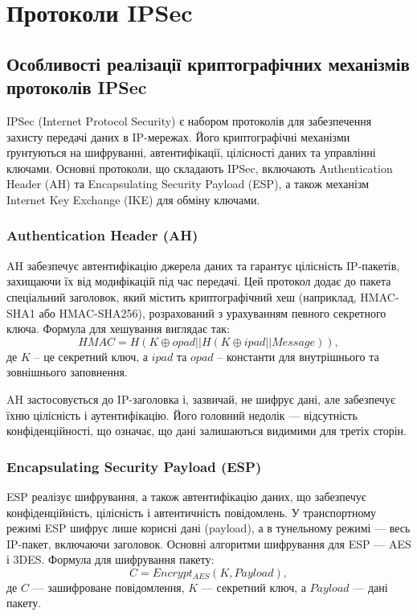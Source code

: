 
\chapter{Протоколи IPSec}
\label{chap:review}  %

\section{Особливості реалізації криптографічних механізмів протоколів IPSec}

IPSec (Internet Protocol Security) є набором протоколів для забезпечення захисту передачі даних в IP-мережах. Його криптографічні механізми ґрунтуються на шифруванні, автентифікації, цілісності даних та управлінні ключами. Основні протоколи, що складають IPSec, включають Authentication Header (AH) та Encapsulating Security Payload (ESP), а також механізм Internet Key Exchange (IKE) для обміну ключами.

\subsection{Authentication Header (AH)}

AH забезпечує автентифікацію джерела даних та гарантує цілісність IP-пакетів, захищаючи їх від модифікацій під час передачі. Цей протокол додає до пакета спеціальний заголовок, який містить криптографічний хеш (наприклад, HMAC-SHA1 або HMAC-SHA256), розрахований з урахуванням певного секретного ключа. Формула для хешування виглядає так:
$$HMAC = H\left(K \oplus opad || H\left(K \oplus ipad || Message\right)\right),$$
де $K$ – це секретний ключ, а $ipad$ та $opad$ – константи для внутрішнього та зовнішнього заповнення.

AH застосовується до IP-заголовка і, зазвичай, не шифрує дані, але забезпечує їхню цілісність і аутентифікацію. Його головний недолік — відсутність конфіденційності, що означає, що дані залишаються видимими для третіх сторін.

\subsection{Encapsulating Security Payload (ESP)}

ESP реалізує шифрування, а також автентифікацію даних, що забезпечує конфіденційність, цілісність і автентичність повідомлень. У транспортному режимі ESP шифрує лише корисні дані (payload), а в тунельному режимі — весь IP-пакет, включаючи заголовок. Основні алгоритми шифрування для ESP — AES і 3DES. Формула для шифрування пакету:
$$C = Encrypt_{AES}(K, Payload),$$
де $C$ — зашифроване повідомлення, $K$ — секретний ключ, а $Payload$ — дані пакету.

